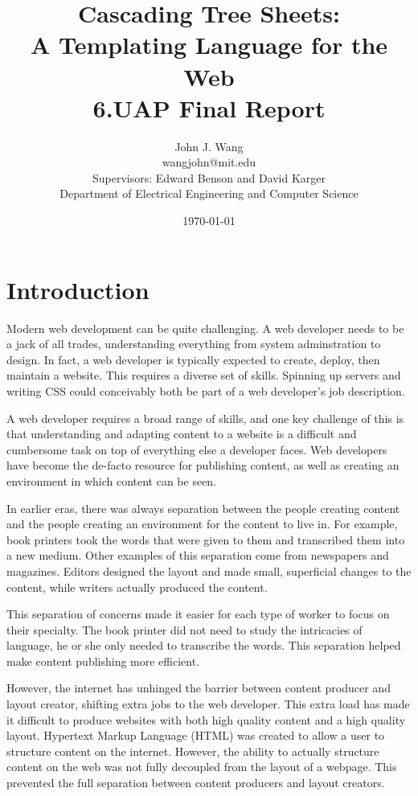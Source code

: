 \documentclass[12pt]{article}
\title{Cascading Tree Sheets:\\ 
A Templating Language for the Web\\
6.UAP Final Report
}
\author{
John J. Wang\\
wangjohn@mit.edu\\
Supervisors: Edward Benson and David Karger\\
Department of Electrical Engineering and Computer Science
}
\date{\today}
\begin{document}
\maketitle

\section{Introduction}

Modern web development can be quite challenging. A web developer needs to be a jack of all trades, understanding everything from system adminstration to design. In fact, a web developer is typically expected to create, deploy, then maintain a website. This requires a diverse set of skills. Spinning up servers and writing CSS could conceivably both be part of a web developer's job description.

A web developer requires a broad range of skills, and one key challenge of this is that understanding and adapting content to a website is a difficult and cumbersome task on top of everything else a developer faces. Web developers have become the de-facto resource for publishing content, as well as creating an environment in which content can be seen.

In earlier eras, there was always separation between the people creating content and the people creating an environment for the content to live in. For example, book printers took the words that were given to them and transcribed them into a new medium. Other examples of this separation come from newspapers and magazines. Editors designed the layout and made small, superficial changes to the content, while writers actually produced the content.

This separation of concerns made it easier for each type of worker to focus on their specialty. The book printer did not need to study the intricacies of language, he or she only needed to transcribe the words. This separation helped make content publishing more efficient.

However, the internet has unhinged the barrier between content producer and layout creator, shifting extra jobs to the web developer. This extra load has made it difficult to produce websites with both high quality content and a high quality layout. Hypertext Markup Language (HTML) was created to allow a user to structure content on the internet. However, the ability to actually structure content on the web was not fully decoupled from the layout of a webpage. This prevented the full separation between content producers and layout creators.
\end{document}
